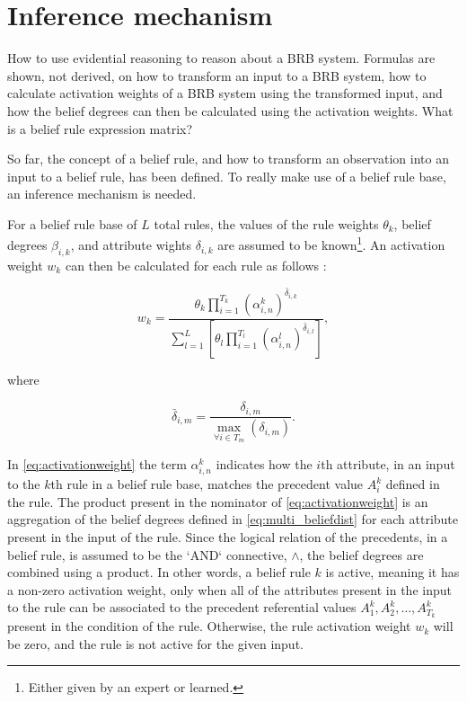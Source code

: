 \section{Inference mechanism}
\label{inference}
{\color{red}
How to use evidential reasoning to reason about a BRB system. Formulas are shown, not derived, on how to transform an input to a BRB system,
how to calculate activation weights of
a BRB system using the transformed input, and how the belief degrees can then be calculated using the activation weights. What is a belief rule expression matrix?
}

So far, the concept of a belief rule, and how to transform an observation into an input to a belief rule, has been defined.
To really make use of a belief rule base, an inference mechanism is needed.

For a belief rule base of $L$ total rules, the values of the rule weights $\theta_k$, belief degrees $\beta_{i, k}$, and attribute
wights $\delta_{i,k}$ are assumed to be known\footnote{Either given by an expert or learned.}. An activation weight $w_k$ can then be calculated for each rule
as follows \cite{Chen2011}:

\begin{equation}
\label{eq:activationweight}
    w_k =
    \frac
    {\theta_k\prod_{i=1}^{T_k}\left(\alpha_{i, n}^k\right)^{\bar{\delta}_{i, k}}}
    {\sum_{l=1}^{L}\left[\theta_l\prod_{i=1}^{T_l}\left(\alpha_{i, n}^l\right)^{\bar{\delta}_{i, l}}\right]},
\end{equation}

where

\begin{equation}
    \label{eq:normdelta}
    \bar{\delta}_{i, m} = \frac{\delta_{i, m}}{\max_{\forall i \in T_m}\left(\delta_{i, m}\right)}.
\end{equation}

In \eqref{eq:activationweight} the term $\alpha_{i, n}^k$ indicates how the $i$th attribute, in an input to the $k$th
rule in a belief rule base, matches the precedent value $A_i^k$ defined in the rule. 
The product present in the nominator of \eqref{eq:activationweight} is an aggregation of the belief degrees 
defined in \eqref{eq:multi_beliefdist}
for each attribute present in the input of the rule. Since the logical relation of the precedents, in a belief rule, 
is assumed to be the `AND` connective, $\land$, the belief degrees are combined using a product. In other words,
a belief rule $k$ is active, meaning it has a non-zero activation weight, only when all of the attributes present in the input to the rule can be associated
to the precedent
referential values $A_1^k, A_2^k, \dots, A_{T_k}^k$ present in the condition of the rule. Otherwise, the rule activation
weight $w_k$ will be zero, and the rule is not active for the given input.

